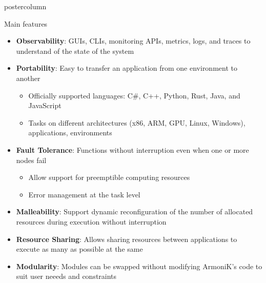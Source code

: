 \begin{frame}[fragile]
\begin{columns}[T]
\begin{column}{.49\textwidth}
\begin{beamercolorbox}[center,wd=\textwidth]{postercolumn}
\begin{minipage}[T]{.96\textwidth}
            \begin{block}{Main features}
                \begin{itemize}
                \item \textbf{Observability}: GUIs, CLIs, monitoring APIs, metrics, logs, and traces to understand of the state of the system
                \item \textbf{Portability}: Easy to transfer an application from one environment to another
                \begin{itemize}
                    \item Officially supported languages: C\#, C++, Python, Rust, Java, and JavaScript
                    \item Tasks on different architectures (x86, ARM, GPU, Linux, Windows), applications, environments
                \end{itemize}
                \item \textbf{Fault Tolerance}: Functions without interruption even when one or more nodes fail
                \begin{itemize}
                    \item Allow support for preemptible computing resources
                    \item Error management at the task level
                \end{itemize}
                \item \textbf{Malleability}: Support dynamic reconfiguration of the number of allocated resources during execution without interruption
                \item \textbf{Resource Sharing}: Allows sharing resources between applications to execute as many as possible at the same
                \item \textbf{Modularity}: Modules can be swapped without modifying ArmoniK's code to suit user neeeds and constraints
                \end{itemize}
            \end{block}


\end{minipage}
\end{beamercolorbox}
\end{column}
\end{columns}
\end{frame}
